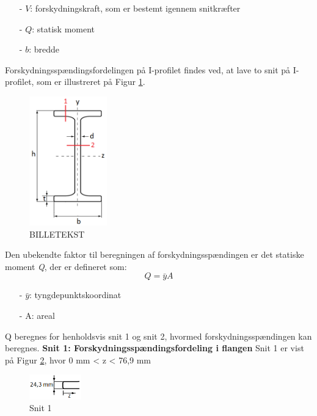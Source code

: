 \begin{itemize}
	\item[-] $V$: forskydningskraft, som er bestemt igennem snitkræfter
	\item[-] $Q$: statisk moment
	\item[-] $b$: bredde
\end{itemize}

Forskydningsspændingsfordelingen på I-profilet findes ved, at lave to snit på I-profilet, som er illustreret på Figur \ref{fig:snitsnit}. 

\begin{figure}[H]
	\centering
	\includegraphics[width=0.3\textwidth]{billeder/forskydningprofil.png}
	\caption{BILLETEKST}
	\label{fig:snitsnit}
\end{figure}

Den ubekendte faktor til beregningen af forskydningsspændingen er det statiske moment \textit{Q}, der er defineret som:
\begin{equation}
Q = \bar{y}A
\end{equation}
\begin{itemize}
	\item[-] $\bar{y}$: tyngdepunktskoordinat
	\item[-] A: areal
\end{itemize}

Q beregnes for henholdsvis snit 1 og snit 2, hvormed forskydningsspændingen kan beregnes. 
\newline
\newline
\textbf{Snit 1: Forskydningsspændingsfordeling i flangen}
\newline
Snit 1 er vist på Figur \ref{fig:snitetforskyd}, hvor 0 mm < z < 76,9 mm

\begin{figure}[H]
	\centering
	\includegraphics[width=0.2\textwidth]{billeder/snitetforskydning.png}
	\caption{Snit 1}
	\label{fig:snitetforskyd}
\end{figure}


